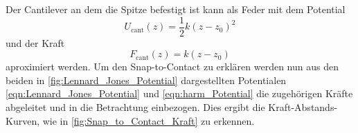     Der Cantilever an dem die Spitze befestigt ist kann als Feder mit dem Potential
    \begin{equation}
        U_{\mathrm{cant}}(z) = \frac{1}{2}k(z - z_0)^2
        \label{eqn:harm_Potential}
    \end{equation}
    und der Kraft
    \begin{equation}
        F_{\mathrm{cant}}(z) = k(z - z_0)
        \label{eqn:harm_Kraft}
    \end{equation}
    aproximiert werden.
    Um den Snap-to-Contact zu erklären werden nun aus den beiden in \autoref{fig:Lennard_Jones_Potential} dargestellten Potentialen \eqref{eqn:Lennard_Jones_Potential} und \eqref{eqn:harm_Potential} die zugehörigen Kräfte abgeleitet und in die Betrachtung einbezogen.
    Dies ergibt die Kraft-Abstands-Kurven, wie in \autoref{fig:Snap_to_Contact_Kraft} zu erkennen.
